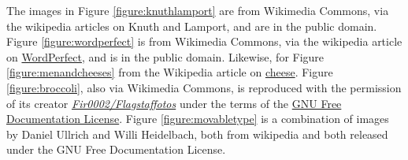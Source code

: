 \begin{refsection}
 The images in Figure \ref{figure:knuthlamport} are from Wikimedia Commons, via the wikipedia articles on Knuth and Lamport, and are in the public domain. Figure \ref{figure:wordperfect} is from Wikimedia Commons, via the wikipedia article on \href{http://en.wikipedia.org/wiki/WordPerfect}{WordPerfect}, and is in the public domain. Likewise, for Figure \ref{figure:menandcheeses} from the Wikipedia article on \href{http://en.wikipedia.org/wiki/Cheese}{cheese}. Figure \ref{figure:broccoli}, also via Wikimedia Commons, is reproduced with the permission of its creator \href{http://commons.wikimedia.org/wiki/User:Fir0002}{\emph{Fir0002/Flagstaffotos}} under the terms of the \href{http://commons.wikimedia.org/wiki/Commons:GNU_Free_Documentation_License_1.2}{GNU Free Documentation License}. Figure \ref{figure:movabletype} is a combination of images by Daniel Ullrich and Willi Heidelbach, both from wikipedia and both released under the GNU Free Documentation License.

\printbibliography[heading=subbibliography]
\end{refsection}

\restoregeometry
\setlength{\parskip}{4pt plus 1pt}%
\setlength{\parindent}{0pt}

\endinput

\section{License}

The text of this exercise is licensed under the terms of the \href{http://creativecommons.org/licenses/by/3.0/}{Creative Commons Attribution 2.0 Generic (CC BY 3.0) License}. 




\appendix

\section{Fire And Ice}
\label{appendix:fireandice}

\begin{quote}
Fire and Ice, \emph{by Robert Frost.}\\

\begin{verse}
Some say the world will end in fire,\\
Some say in ice.\\
From what I've tasted of desire\\
I hold with those who favor fire.\\
But if it had to perish twice,\\
I think I know enough of hate\\
To say that for destruction ice\\
Is also great\\
And would suffice.\\
\end{verse}
\end{quote}

